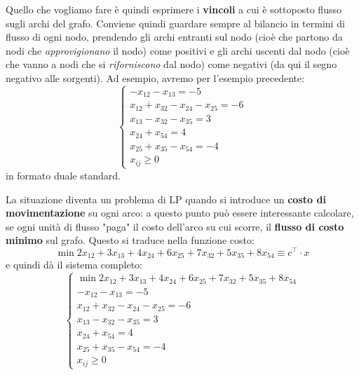 \documentclass[a4paper,11pt]{article}
\begin{document}
Quello che vogliamo fare è quindi esprimere i \textbf{vincoli} a cui è sottoposto flusso sugli archi del grafo.
Conviene quindi guardare sempre al bilancio in termini di flusso di ogni nodo, prendendo gli archi entranti sul nodo (cioè che partono da nodi che \textit{approvigionano} il nodo) come positivi e gli archi uscenti dal nodo (cioè che vanno a nodi che si \textit{riforniscono} dal nodo) come negativi (da qui il segno negativo alle sorgenti).
Ad esempio, avremo per l'esempio precedente:
\[
	\begin{cases}
		-x_{12} - x_{13} = -5 \\ 
		x_{12} + x_{32} - x_{24} - x_{25} = -6 \\ 
		x_{13} - x_{32} - x_{35} = 3 \\ 
		x_{24} + x_{54} = 4 \\ 
		x_{25 }+ x_{35} - x_{54} = -4 \\ 
		x_{ij} \geq 0
	\end{cases}
\]
in formato duale standard.

La situazione diventa un problema di LP quando si introduce un \textbf{costo di movimentazione} su ogni arco: a questo punto può essere interessante calcolare, se ogni unità di flusso "paga" il costo dell'arco su cui scorre, il \textbf{flusso di costo minimo} sul grafo.
Questo si traduce nella funzione costo:
$$
\min{2 x_{12} + 3 x_{13} + 4 x_{24} + 6 x_{25} + 7 x_{32} + 5 x_{35} + 8 x_{54} \equiv c^\intercal \cdot x}
$$
e quindi dà il sistema completo:
\[
	\begin{cases}
		\min{2 x_{12} + 3 x_{13} + 4 x_{24} + 6 x_{25} + 7 x_{32} + 5 x_{35} + 8 x_{54}} \\ 
		-x_{12} - x_{13} = -5 \\ 
		x_{12} + x_{32} - x_{24} - x_{25} = -6 \\ 
		x_{13} - x_{32} - x_{35} = 3 \\ 
		x_{24} + x_{54} = 4 \\ 
		x_{25 }+ x_{35} - x_{54} = -4 \\ 
		x_{ij} \geq 0
	\end{cases}
\]
\end{document}
